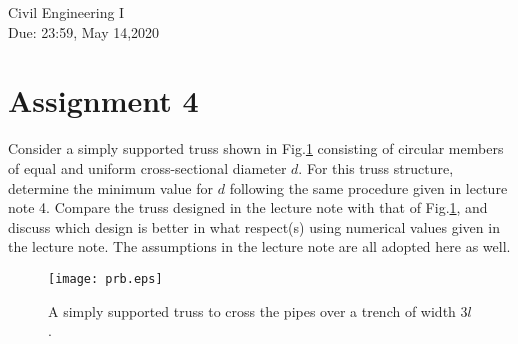 \documentclass[10pt,a4j]{article}
\newlength{\minitwocolumn}
\begin{document}
\newcommand{\fat}[1]{\mbox{\boldmath $#1$}}
\newcommand{\D}{\partial}
\newcommand{\w}{\omega}
\newcommand{\ga}{\alpha}
\newcommand{\gb}{\beta}
\newcommand{\gx}{\xi}
\newcommand{\gz}{\zeta}
\newcommand{\vhat}[1]{\hat{\fat{#1}}}
\newcommand{\spc}{\vspace{0.7\baselineskip}}
\newcommand{\halfspc}{\vspace{0.3\baselineskip}}

\newcommand{\twofig}[2]
 {
   \begin{figure}
     \begin{minipage}[t]{\minitwocolumn}
         \begin{center}   #1
         \end{center}
     \end{minipage}
         \hspace{\columnsep}
     \begin{minipage}[t]{\minitwocolumn}
         \begin{center} #2
         \end{center}
     \end{minipage}
   \end{figure}
 }
\begin{flushright}
	{Civil Engineering I \\ 
	Due: 23:59, May 14,2020
	}
\end{flushright}
\hspace{10mm}
\section*{Assignment 4}
Consider a simply supported truss shown in Fig.\ref{fig:prb} consisting 
of circular members of equal and uniform cross-sectional diameter $d$. 
For this truss structure, determine the minimum value for $d$ following 
the same procedure given in lecture note 4. Compare the truss designed 
in the lecture note with that of Fig.\ref{fig:prb}, and discuss which 
design is better in what respect(s) using numerical values given 
in the lecture note. The assumptions in the lecture note are all 
adopted here as well. 
    \begin{figure}[h]
        \begin{center}
        \texttt{[image: prb.eps]} 
        \end{center}
        \caption{
	A simply supported truss to cross the pipes over a trench of width $3l$.
	  } 
        \label{fig:prb}
    \end{figure}
\end{document}

